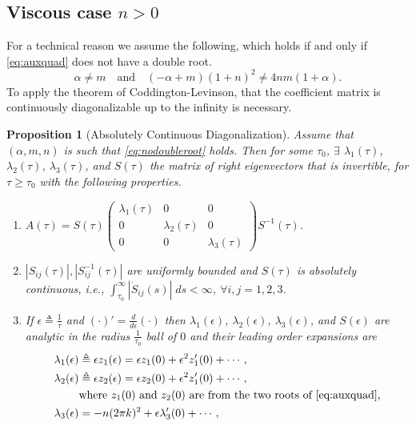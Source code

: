 \documentclass[a4paper,11pt]{article}
\newtheorem{proposition}{Proposition}[section]
\theoremstyle{remark}
\begin{document}
\subsection{Viscous case $n>0$}
For a technical reason we assume the following, which holds if and only if \eqref{eq:auxquad} does not have a double root.
 \begin{equation}
  \alpha\ne m \quad \text{and} \quad (-\alpha+m)(1+n)^2 \ne 4nm(1+\alpha). \tag{$A0$} \label{eq:nodoubleroot}
\end{equation}
To apply the theorem of Coddington-Levinson, that the coefficient matrix is continuously diagonalizable up to the infinity is necessary.
\begin{proposition}[Absolutely Continuous Diagonalization] \label{prop:ctsdiag}
 Assume that $(\alpha,m,n)$ is such that \eqref{eq:nodoubleroot} holds. Then for some $\tau_0$, $\exists$ $\lambda_1(\tau)$, $\lambda_2(\tau)$, $\lambda_3(\tau)$, and $S(\tau)$ the matrix of right eigenvectors that is invertible, for $\tau\ge\tau_0$  with the following properties.
 \begin{enumerate}
  \item $A(\tau) = S(\tau) \begin{pmatrix} \lambda_1(\tau) & 0 & 0\\ 0 & \lambda_2(\tau) & 0 \\ 0 & 0 & \lambda_3(\tau) \end{pmatrix} S^{-1}(\tau)$.%
  \item $|S_{ij}(\tau)|, |S^{-1}_{ij}(\tau)|$ are uniformly bounded and $S(\tau)$ is absolutely continuous, i.e., $\int_{\tau_0}^\infty |\dot{S}_{ij}(s)|\; ds <\infty$, $\forall i,j=1,2,3$.
  \item If $\epsilon\triangleq \frac{1}{\tau}$ and $(\cdot)'=\frac{d}{d\epsilon}(\cdot)$ then $\lambda_1(\epsilon)$, $\lambda_2(\epsilon)$, $\lambda_3(\epsilon)$, and $S(\epsilon)$ are analytic in the radius $\frac{1}{\tau_0}$ ball of $0$ and their leading order expansions are
  \begin{align}
   \lambda_1(\epsilon) &\triangleq \epsilon z_1(\epsilon) = \epsilon z_1(0) + \epsilon^2 z_1'(0) + \cdots,\nonumber\\
   \lambda_2(\epsilon) &\triangleq \epsilon z_2(\epsilon) =\epsilon z_2(0) + \epsilon^2 z_1'(0) + \cdots,\nonumber\\ &\text{where $z_1(0)$ and $z_2(0)$ are from the two roots of \eqref{eq:auxquad},}\nonumber \\
   \lambda_3(\epsilon) &= -n(2\pi k)^2 + \epsilon\lambda_3'(0) + \cdots,\\

\end{align}
\end{enumerate}
\end{proposition}
\end{document}
